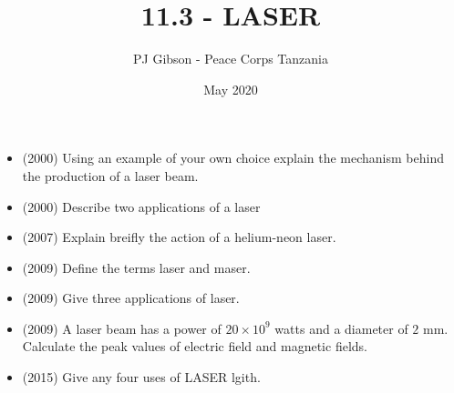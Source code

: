 \documentclass{article}
\title{\textbf{11.3 - LASER}}
\author{PJ Gibson - Peace Corps Tanzania}
\date{May 2020}
\begin{document}
\maketitle

\begin{itemize}
\item (2000)  Using an example of your own choice explain the mechanism behind the production of a laser beam.
\item (2000)  Describe two applications of a laser
\item (2007)  Explain breifly the action of a helium-neon laser.
\item (2009)  Define the terms laser and maser. 
\item (2009)  Give three applications of laser. 
\item (2009)  A laser beam has a power of $ 20 \times 10^{9}$ watts and a diameter of $ 2$ mm.  Calculate the peak values of electric field and magnetic fields.
\item (2015)  Give any four uses of LASER lgith.
\end{itemize}
\end{document}
